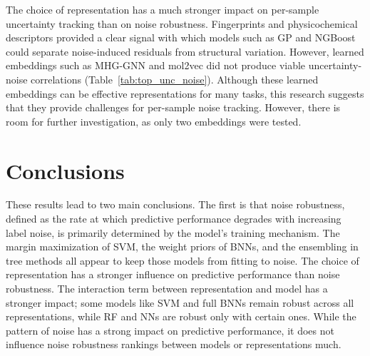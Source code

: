 The choice of representation has a much stronger impact on per-sample uncertainty tracking than on noise robustness. Fingerprints and physicochemical descriptors provided a clear signal with which models such as GP and NGBoost could separate noise-induced residuals from structural variation. However, learned embeddings such as MHG-GNN and mol2vec did not produce viable uncertainty-noise correlations (Table~\ref{tab:top_unc_noise}). Although these learned embeddings can be effective representations for many tasks, this research suggests that they provide challenges for per-sample noise tracking. However, there is room for further investigation, as only two embeddings were tested.

\section{Conclusions}

These results lead to two main conclusions. The first is that noise robustness, defined as the rate at which predictive performance degrades with increasing label noise, is primarily determined by the model's training mechanism. The margin maximization of SVM, the weight priors of BNNs, and the ensembling in tree methods all appear to keep those models from fitting to noise. The choice of representation has a stronger influence on predictive performance than noise robustness. The interaction term between representation and model has a stronger impact; some models like SVM and full BNNs remain robust across all representations, while RF and NNs are robust only with certain ones. While the pattern of noise has a strong impact on predictive performance, it does not influence noise robustness rankings between models or representations much.


